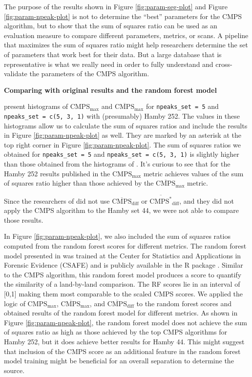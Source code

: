 The purpose of the results shown in Figure \ref{fig:param-seg-plot} and
Figure \ref{fig:param-npeak-plot} is not to determine the ``best''
parameters for the CMPS algorithm, but to show that the sum of squares
ratio can be used as an evaluation measure to compare different
parameters, metrics, or scans. A pipeline that maximizes the sum of
squares ratio might help researchers determine the set of parameters
that work best for their data. But a large database that is
representative is what we really need in order to fully understand and
cross-validate the parameters of the CMPS algorithm.

\textbf{Comparing with original results and the random forest model}

\citet{cmps} present histograms of \(\mathrm{CMPS_{max}}\) and
\(\mathrm{\overline{CMPS}_{max}}\) for \texttt{npeaks\_set\ =\ 5} and
\texttt{npeaks\_set\ =\ c(5,\ 3,\ 1)} with (presumably) Hamby 252. The
values in these histograms allow us to calculate the sum of squares
ratios and include the results in Figure \ref{fig:param-npeak-plot} as
well. They are marked by an asterisk at the top right corner in Figure
\ref{fig:param-npeak-plot}. The sum of squares ratios we obtained for
\texttt{npeaks\_set\ =\ 5} and \texttt{npeaks\_set\ =\ c(5,\ 3,\ 1)} is
slightly higher than those obtained from the histograms of \citet{cmps}.
It's curious to see that for the Hamby 252 results published in
\citet{cmps} the \(\mathrm{{CMPS}_{max}}\) metric achieves values of the
sum of squares ratio higher than those achieved by the
\(\mathrm{\overline{CMPS}_{max}}\) metric.

Since the researchers of \citet{cmps} did not use
\(\mathrm{\overline{CMPS}_{diff}}\) or
\(\mathrm{\overline{CMPS^*}_{diff}}\), and they did not apply the CMPS
algorithm to the Hamby set 44, we were not able to compare those
results.

In Figure \ref{fig:param-npeak-plot}, we also included the sum of
squares ratios computed from the random forest scores \citep{aoas} for
different metrics. The random forest model presented in \citet{aoas} was
trained at the Center for Statistics and Applications in Forensic
Evidence (CSAFE) and is publicly available in the R package
 \citep{bulletxtrctr}. Similar to the CMPS algorithm,
this random forest model produces a score to quantify the similarity of
a land-by-land comparison. The RF scores lie in an interval of {[}0,1{]}
making them most comparable to the scaled CMPS scores. We applied the
logic of \(\mathrm{{CMPS}_{max}}\), \(\mathrm{\overline{CMPS}_{max}}\),
and \(\mathrm{\overline{CMPS}_{diff}}\) to the random forest scores and
obtained results of the random forest model for different metrics. As
shown in Figure \ref{fig:param-npeak-plot}, the random forest model does
not achieve the sum of squares ratio as high as those achieved by the
top CMPS algorithms for Hamby 252, but it does achieve better results
for Hamby 44. This might suggest that inclusion of the CMPS score as an
additional feature in the random forest model training might be
beneficial for an overall separation to determine the source.

